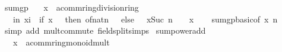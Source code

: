 \begin{isabellebody}
\endisatagproof
{\isafoldproof}%
%
\isadelimproof
%
\endisadelimproof
%
\isadelimdocument
%
\endisadelimdocument
%
\isatagdocument
%
\isamarkuptrue%
%
\endisatagdocument
{\isafolddocument}%
%
\isadelimdocument
%
\endisadelimdocument
{}\isamarkupfalse%
\ sum{\isacharunderscore}{\kern0pt}gp{}{\isacharcolon}{\kern0pt}\isanewline
\ \ \ x\ {\isacharcolon}{\kern0pt}{\isacharcolon}{\kern0pt}\ {\isachardoublequoteopen}{\isacharprime}{\kern0pt}a{\isacharcolon}{\kern0pt}{\isacharcolon}{\kern0pt}{\isacharbraceleft}{\kern0pt}comm{\isacharunderscore}{\kern0pt}ring{\isacharcomma}{\kern0pt}division{\isacharunderscore}{\kern0pt}ring{\isacharbraceright}{\kern0pt}{\isachardoublequoteclose}\isanewline
\ \ \ {\isachardoublequoteopen}{\isacharparenleft}{\kern0pt}{\isasymSum}i{\isasymle}n{\isachardot}{\kern0pt}\ x{\isacharcircum}{\kern0pt}i{\isacharparenright}{\kern0pt}\ {\isacharequal}{\kern0pt}\ {\isacharparenleft}{\kern0pt}if\ x\ {\isacharequal}{\kern0pt}\ {}\ then\ of{\isacharunderscore}{\kern0pt}nat{\isacharparenleft}{\kern0pt}n\ {\isacharplus}{\kern0pt}\ {}{\isacharparenright}{\kern0pt}\ else\ {\isacharparenleft}{\kern0pt}{}\ {\isacharminus}{\kern0pt}\ x{\isacharcircum}{\kern0pt}Suc\ n{\isacharparenright}{\kern0pt}\ {\isacharslash}{\kern0pt}\ {\isacharparenleft}{\kern0pt}{}\ {\isacharminus}{\kern0pt}\ x{\isacharparenright}{\kern0pt}{\isacharparenright}{\kern0pt}{\isachardoublequoteclose}\isanewline
%
\isadelimproof
\ \ %
\endisadelimproof
%
\isatagproof
{}\isamarkupfalse%
\ sum{\isacharunderscore}{\kern0pt}gp{\isacharunderscore}{\kern0pt}basic{\isacharbrackleft}{\kern0pt}of\ x\ n{\isacharbrackright}{\kern0pt}\isanewline
\ \ \isamarkupfalse%
\ {\isacharparenleft}{\kern0pt}simp\ add{\isacharcolon}{\kern0pt}\ mult{\isachardot}{\kern0pt}commute\ field{\isacharunderscore}{\kern0pt}split{\isacharunderscore}{\kern0pt}simps{\isacharparenright}{\kern0pt}%
\endisatagproof
{\isafoldproof}%
%
\isadelimproof
\isanewline
%
\endisadelimproof
\isanewline
{}\isamarkupfalse%
\ sum{\isacharunderscore}{\kern0pt}power{\isacharunderscore}{\kern0pt}add{\isacharcolon}{\kern0pt}\isanewline
\ \ \ x\ {\isacharcolon}{\kern0pt}{\isacharcolon}{\kern0pt}\ {\isachardoublequoteopen}{\isacharprime}{\kern0pt}a{\isacharcolon}{\kern0pt}{\isacharcolon}{\kern0pt}{\isacharbraceleft}{\kern0pt}comm{\isacharunderscore}{\kern0pt}ring{\isacharcomma}{\kern0pt}monoid{\isacharunderscore}{\kern0pt}mult{\isacharbraceright}{\kern0pt}{\isachardoublequoteclose}\isanewline

\end{isabellebody}
